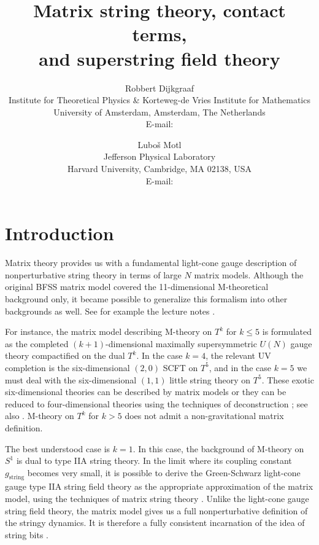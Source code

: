 \documentclass[nohyper,12pt,letterpaper]{JHEP3}
\title{Matrix string theory, contact terms,\\
  and superstring field theory}
\author{Robbert Dijkgraaf\\
  Institute for Theoretical Physics \& Korteweg-de Vries Institute for 
Mathematics\\
  University of Amsterdam, Amsterdam, The Netherlands\\
E-mail: \email{rhd@science.uva.nl}}
\author{Lubo\v{s} Motl\\
  Jefferson Physical Laboratory\\
  Harvard University, Cambridge, MA 02138, USA\\
E-mail: \email{motl@feynman.harvard.edu}}
\def \gs{g_{\mathrm{string}}}
\begin{document}

\section{Introduction}

Matrix theory provides us with
a fundamental light-cone gauge description of nonperturbative string 
theory in terms of large $N$ matrix models. Although the original BFSS 
matrix model \cite{bfss} covered the 11-dimensional M-theoretical 
background only, it became possible to generalize this formalism 
into other backgrounds as well. See for example the lecture notes
\cite{bilal,banksreview,bigatti,micronotes,taylorreview}.

For instance, the matrix model describing M-theory on $T^k$ for $k\leq
5$ is formulated as the completed $(k+1)$-dimensional maximally
supersymmetric $U(N)$ gauge theory compactified on the dual $T^k$. In
the case $k=4$, the relevant UV completion is the six-dimensional
$(2,0)$ SCFT on $T^5$, and in the case $k=5$ we must deal with the
six-dimensional $(1,1)$ little string theory on $T^5$. These exotic
six-dimensional theories can be described by matrix models
\cite{sixmatrixA,sixmatrixB} or they can be reduced to
four-dimensional theories using the techniques of deconstruction
\cite{lstdecon};
see also \cite{ingodecon}. M-theory on $T^k$ for $k>5$ does not admit a
non-gravitational matrix definition.

The best understood case is $k=1$. In this case, the background of
M-theory on $S^1$ is dual to type IIA string theory. In the limit
where its coupling constant $\gs$ becomes very small, it is possible
to derive the Green-Schwarz light-cone gauge type IIA string field
theory as the appropriate approximation of the matrix model, using the
techniques of matrix string theory \cite{lumodvv,bsdvv,dvv}. Unlike
the light-cone gauge string field theory, the matrix model gives us a
full nonperturbative definition of the stringy dynamics.
It is therefore a fully consistent incarnation of the idea of string bits 
\cite{thornone,thorntwo,thornthree}.
\end{document}
